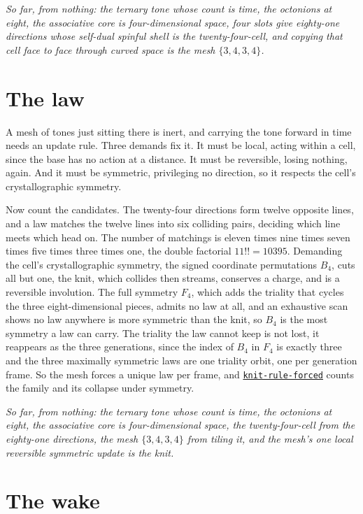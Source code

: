 \documentclass{article}
\newcommand{\code}[2]{\href{https://github.com/cluesurf/vibe/blob/make/#1}{\texttt{#2}}}
\begin{document}
\emph{So far, from nothing: the ternary tone whose count is time, the octonions at eight, the
associative core is four-dimensional space, four slots give eighty-one directions whose self-dual
spinful shell is the twenty-four-cell, and copying that cell face to face through curved space is
the mesh $\{3,4,3,4\}$.}

\section{The law}

A mesh of tones just sitting there is inert, and carrying the tone forward in time needs an update
rule. Three demands fix it. It must be local, acting within a cell, since the base has no action
at a distance. It must be reversible, losing nothing, again. And it must be symmetric, privileging
no direction, so it respects the cell's crystallographic symmetry.

Now count the candidates. The twenty-four
directions form twelve opposite lines, and a law matches the twelve lines into six colliding
pairs, deciding which line meets which head on. The number of matchings is eleven times nine times
seven times five times three times one, the double factorial $11!! = 10395$. Demanding the cell's
crystallographic symmetry, the signed coordinate permutations $B_4$, cuts all but one, the knit,
which collides then streams, conserves a charge, and is a reversible involution. The full symmetry
$F_4$, which adds the triality that cycles the three eight-dimensional pieces, admits no law at
all, and an exhaustive scan shows no law anywhere is more symmetric than the knit, so $B_4$ is the
most symmetry a law can carry. The triality the law cannot keep is not lost, it reappears as the
three generations, since the index of $B_4$ in $F_4$ is exactly three and the three maximally
symmetric laws are one triality orbit, one per generation frame. So the mesh forces a unique law
per frame, and
\code{test/experiment/foundations/knit-rule-forced.ts}{knit-rule-forced} counts the family and its
collapse under symmetry.

\emph{So far, from nothing: the ternary tone whose count is time, the octonions at eight, the
associative core is four-dimensional space, the twenty-four-cell from the eighty-one directions,
the mesh $\{3,4,3,4\}$ from tiling it, and the mesh's one local reversible symmetric update is the
knit.}

\section{The wake}
\end{document}
